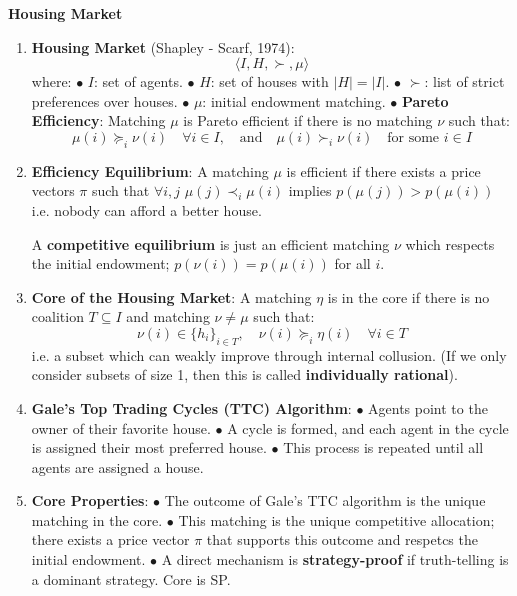 \documentclass[10pt]{scrartcl}
\newcommand{\vocab}[1]{\textbf{\color{blue} #1}}
\renewcommand{\section}[1]{\begin{center}\textbf{\color{red}#1}\end{center}}
\begin{document}
\begin{multicols*}{2}
    \section{Housing Market}
    \begin{enumerate}
        \item \vocab{Housing Market} (Shapley - Scarf, 1974):
        \[
        \langle I, H, \succ, \mu \rangle
        \]
        where:
        $\bullet$ \( I \): set of agents.
        $\bullet$ \( H \): set of houses with \( |H| = |I| \).
        $\bullet$ \( \succ \): list of strict preferences over houses.
        $\bullet$ \( \mu \): initial endowment matching.
        $\bullet$ \vocab{Pareto Efficiency}: Matching \( \mu \) is Pareto efficient if there is no matching \( \nu \) such that:
        \[
        \mu(i) \succeq_i \nu(i) \quad \forall i \in I, \quad \text{and} \quad \mu(i) \succ_i \nu(i) \quad \text{for some } i \in I
        \]
        
        \item \vocab{Efficiency Equilibrium}: A matching $\mu$ is efficient if there
        exists a price vectors $\pi$ such that $\forall i,j$ $\mu(j) \prec_i \mu(i)$
        implies $p(\mu(j)) > p(\mu(i))$ i.e. nobody can afford a better house.
        
        A \vocab{competitive equilibrium}
        is just an efficient matching $\nu$ which respects the initial endowment;
        $p(\nu(i)) = p(\mu(i))$ for all $i$.

        \item \vocab{Core of the Housing Market}:
        A matching \( \eta \) is in the core if there is no coalition \( T \subseteq I \) and matching \( \nu\neq \mu \) such that:
        \[
        \nu(i) \in \{h_i\}_{i \in T}, \quad \nu(i) \succeq_i \eta(i) \quad \forall i \in T
        \]
        i.e. a subset which can weakly improve through internal collusion.
        (If we only consider subsets of size 1, then this is called \vocab{individually rational}).

        \item \vocab{Gale’s Top Trading Cycles (TTC) Algorithm}:
        $\bullet$ Agents point to the owner of their favorite house.
        $\bullet$ A cycle is formed, and each agent in the cycle is assigned their most preferred house.
        $\bullet$ This process is repeated until all agents are assigned a house.

        \item \vocab{Core Properties}:
        $\bullet$ The outcome of Gale’s TTC algorithm is the unique matching in the core.
        $\bullet$ This matching is the unique competitive allocation; there exists
        a price vector $\pi$ that supports this outcome and respetcs the initial endowment.
        $\bullet$ A direct mechanism is
        \vocab{strategy-proof} if truth-telling is a dominant strategy. Core is SP.


\end{enumerate}
\end{multicols*}
\end{document}
